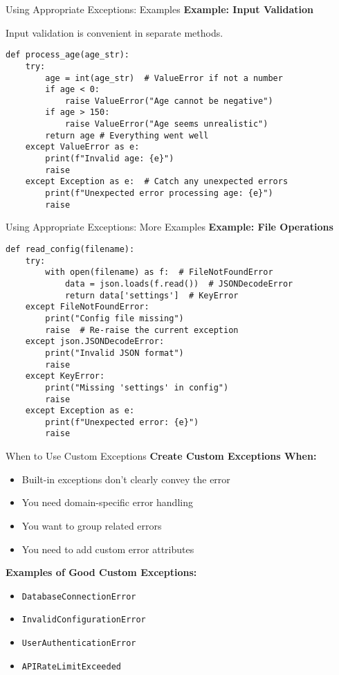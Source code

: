 \documentclass[aspectratio=169]{beamer}
\begin{document}
\begin{frame}[fragile]{Using Appropriate Exceptions: Examples}
    \textbf{Example: Input Validation}
    
    Input validation is convenient in separate methods.
    \pause
    \begin{lstlisting}
def process_age(age_str):
    try:
        age = int(age_str)  # ValueError if not a number
        if age < 0:
            raise ValueError("Age cannot be negative")
        if age > 150:
            raise ValueError("Age seems unrealistic")
        return age # Everything went well
    except ValueError as e:
        print(f"Invalid age: {e}")
        raise
    except Exception as e:  # Catch any unexpected errors
        print(f"Unexpected error processing age: {e}")
        raise
    \end{lstlisting}
\end{frame}

\begin{frame}[fragile]{Using Appropriate Exceptions: More Examples}
    \textbf{Example: File Operations}
    \pause
    \begin{lstlisting}
def read_config(filename):
    try:
        with open(filename) as f:  # FileNotFoundError
            data = json.loads(f.read())  # JSONDecodeError
            return data['settings']  # KeyError
    except FileNotFoundError:
        print("Config file missing")
        raise  # Re-raise the current exception
    except json.JSONDecodeError:
        print("Invalid JSON format")
        raise
    except KeyError:
        print("Missing 'settings' in config")
        raise
    except Exception as e:
        print(f"Unexpected error: {e}")
        raise
    \end{lstlisting}
\end{frame}

\begin{frame}{When to Use Custom Exceptions}
    \textbf{Create Custom Exceptions When:}
    \begin{itemize}
        \item Built-in exceptions don't clearly convey the error
        \item You need domain-specific error handling
        \item You want to group related errors
        \item You need to add custom error attributes
    \end{itemize}

    \textbf{Examples of Good Custom Exceptions:}
    \begin{itemize}
        \item \texttt{DatabaseConnectionError}
        \item \texttt{InvalidConfigurationError}
        \item \texttt{UserAuthenticationError}
        \item \texttt{APIRateLimitExceeded}
    \end{itemize}
\end{frame}
\end{document}

